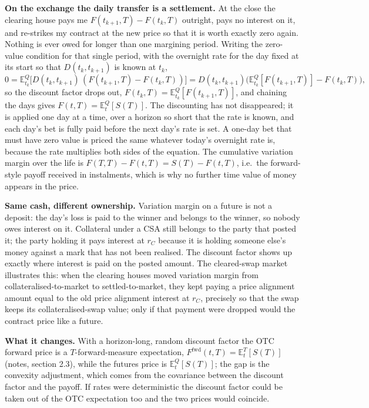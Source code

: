 \documentclass[10pt]{article}
\newcommand{\E}{\mathbb{E}}
\begin{document}
\textbf{On the exchange the daily transfer is a settlement.} At the close the clearing house pays me $F(t_{k+1},T)-F(t_k,T)$ outright, pays no
interest on it, and re-strikes my contract at the new price so that it is worth exactly zero again. Nothing is ever owed for longer than one
margining period. Writing the zero-value condition for that single period, with the overnight rate for the day fixed at its start so that
$D(t_k,t_{k+1})$ is known at $t_k$,
\[
0 = \E^{Q}_{t_k}\!\bigl[D(t_k,t_{k+1})\,(F(t_{k+1},T)-F(t_k,T))\bigr] = D(t_k,t_{k+1})\bigl(\E^{Q}_{t_k}[F(t_{k+1},T)] - F(t_k,T)\bigr),
\]
so the discount factor drops out, $F(t_k,T)=\E^{Q}_{t_k}[F(t_{k+1},T)]$, and chaining the days gives $F(t,T)=\E^{Q}_t[S(T)]$. The
discounting has not disappeared; it is applied one day at a time, over a horizon so short that the rate is known, and each day's bet is
fully paid before the next day's rate is set. A one-day bet that must have zero value is priced the same whatever today's overnight rate
is, because the rate multiplies both sides of the equation. The cumulative variation margin over the life is $F(T,T)-F(t,T)=S(T)-F(t,T)$,
i.e.\ the forward-style payoff received in instalments, which is why no further time value of money appears in the price.

\textbf{Same cash, different ownership.} Variation margin on a future is not a deposit: the day's loss is paid to the winner and belongs
to the winner, so nobody owes interest on it. Collateral under a CSA still belongs to the party that posted it; the party holding it pays
interest at $r_C$ because it is holding someone else's money against a mark that has not been realised. The discount factor shows up exactly
where interest is paid on the posted amount. The cleared-swap market illustrates this: when the clearing houses moved variation margin
from collateralised-to-market to settled-to-market, they kept paying a price alignment amount equal to the old price alignment interest at
$r_C$, precisely so that the swap keeps its collateralised-swap value; only if that payment were dropped would the contract price like a future.

\textbf{What it changes.} With a horizon-long, random discount factor the OTC forward price is a $T$-forward-measure expectation,
$F^{\mathrm{fwd}}(t,T)=\E^{T}_t[S(T)]$ (notes, section 2.3), while the futures price is $\E^{Q}_t[S(T)]$; the gap is the convexity
adjustment, which comes from the covariance between the discount factor and the payoff. If rates were deterministic the discount factor
could be taken out of the OTC expectation too and the two prices would coincide.
\end{document}
